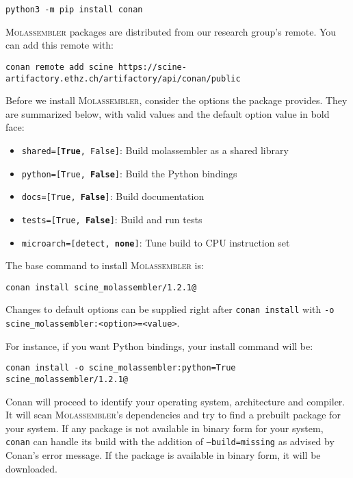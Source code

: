 \documentclass[]{tufte-book}
\begin{document}
\begin{Verbatim}
python3 -m pip install conan
\end{Verbatim}

\textsc{Molassembler} packages are distributed from our research group's remote.
You can add this remote with:

\begin{Verbatim}
conan remote add scine https://scine-artifactory.ethz.ch/artifactory/api/conan/public
\end{Verbatim}

Before we install \textsc{Molassembler}, consider the options the package 
provides. They are summarized below, with valid values and the default option
value in bold face:

\begin{itemize} 
  \item \texttt{shared=[\textbf{True}, False]}: Build molassembler as a shared
    library
  \item \texttt{python=[True, \textbf{False}]}: Build the Python bindings
  \item \texttt{docs=[True, \textbf{False}]}: Build documentation
  \item \texttt{tests=[True, \textbf{False}]}: Build and run tests
  \item \texttt{microarch=[detect, \textbf{none}]}: Tune build to CPU
    instruction set
\end{itemize}

The base command to install \textsc{Molassembler} is:

\begin{Verbatim}
conan install scine_molassembler/1.2.1@
\end{Verbatim}

Changes to default options can be supplied right after \texttt{conan install}
with \texttt{-o scine\_molassembler:<option>=<value>}.

For instance, if you want Python bindings, your install command will be:

\begin{Verbatim}
conan install -o scine_molassembler:python=True scine_molassembler/1.2.1@
\end{Verbatim}

Conan will proceed to identify your operating system, architecture and compiler.
It will scan \textsc{Molassembler}'s dependencies and try to find a prebuilt
package for your system. If any package is not available in binary form for your
system, \texttt{conan} can handle its build with the addition of
\texttt{--build=missing} as advised by Conan's error message. If the package is
available in binary form, it will be downloaded.
\end{document}
